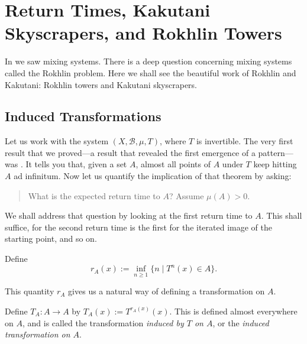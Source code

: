 \documentclass[11pt,a4paper]{article}
\begin{document}
\section*{Return Times, Kakutani Skyscrapers, and Rokhlin Towers}
In  we saw mixing systems. There is a deep question concerning
mixing systems called the Rokhlin problem. Here we shall see the beautiful work of Rokhlin and Kakutani:
Rokhlin towers and Kakutani skyscrapers.

\subsection{Induced Transformations}
Let us work with the system $(X,\mathcal B,\mu,T)$, where $T$ is invertible.
The very first result that we proved---a result that revealed the first
emergence of a pattern---was . It tells you
that, given a set $A$, almost all points of $A$ under $T$ keep hitting $A$ ad
infinitum. Now let us quantify the implication of that theorem by asking:
\begin{quote}
What is the expected return time to $A$? Assume $\mu(A)>0$.
\end{quote}
We shall address that question by looking at the first return time to $A$.
This shall suffice, for the second return time is the first for the iterated
image of the starting point, and so on.

Define
\[
 r_A(x):=\inf_{n\geq1}\{n\mid T^n(x)\in A\}.
\]

This quantity $r_A$ gives us a natural way of defining a transformation on
$A$.
\setcounter{definition}{8}\begin{definition}
Define $T_A\colon A\to A$ by $T_A(x):=T^{r_A(x)}(x)$. This is defined almost everywhere on $A$, and is called the transformation \emph{induced by $T$ on $A$}, or the \emph{induced transformation on $A$}.
\end{definition}
\end{document}
